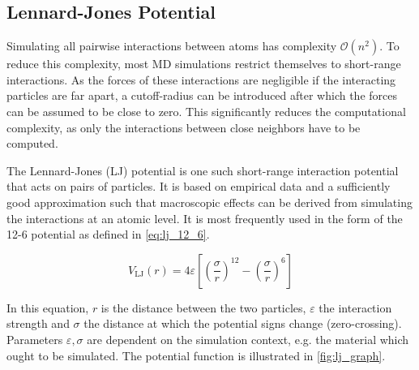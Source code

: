 
\subsection{Lennard-Jones Potential}
\label{sec:lj_potential}
Simulating all pairwise interactions between atoms has complexity $\mathcal{O}\left(n^2\right)$. To reduce this complexity, most MD simulations restrict themselves to short-range interactions. As the forces of these interactions are negligible if the interacting particles are far apart, a cutoff-radius can be introduced after which the forces can be assumed to be close to zero. This significantly reduces the computational complexity, as only the interactions between close neighbors have to be computed. \cite{Gratl2021}

The Lennard-Jones (LJ) potential is one such short-range interaction potential that acts on pairs of particles. It is based on empirical data and a sufficiently good approximation such that macroscopic effects can be derived from simulating the interactions at an atomic level.
It is most frequently used in the form of the 12-6 potential as defined in \eqref{eq:lj_12_6}.

\begin{equation}
	V_{\text{LJ}}(r)=4\varepsilon\left[\left(\frac{\sigma}{r}\right)^{12}-\left(\frac{\sigma}{r}\right)^{6}\right]\label{eq:lj_12_6}
\end{equation}

In this equation, $r$ is the distance between the two particles, $\varepsilon$ the interaction strength and $\sigma$ the distance at which the potential signs change (zero-crossing). Parameters $\varepsilon, \sigma$ are dependent on the simulation context, e.g. the material which ought to be simulated. The potential function is illustrated in \autoref{fig:lj_graph}. \cite{Wang2020, Lenhard2024}


